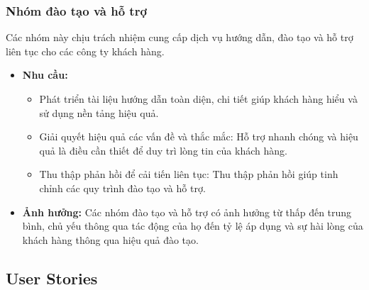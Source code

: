 \subsubsection{Nhóm đào tạo và hỗ trợ}

Các nhóm này chịu trách nhiệm cung cấp dịch vụ hướng dẫn, đào tạo và hỗ trợ liên tục cho các công ty khách hàng.

\begin{itemize}
    \item \textbf{Nhu cầu:}
    \begin{itemize}
        \item Phát triển tài liệu hướng dẫn toàn diện, chi tiết giúp khách hàng hiểu và sử dụng nền tảng hiệu quả.
        \item Giải quyết hiệu quả các vấn đề và thắc mắc: Hỗ trợ nhanh chóng và hiệu quả là điều cần thiết để duy trì lòng tin của khách hàng.
        \item Thu thập phản hồi để cải tiến liên tục: Thu thập phản hồi giúp tinh chỉnh các quy trình đào tạo và hỗ trợ.
    \end{itemize}
    \item \textbf{Ảnh hưởng:} Các nhóm đào tạo và hỗ trợ có ảnh hưởng từ thấp đến trung bình, chủ yếu thông qua tác động của họ đến tỷ lệ áp dụng và sự hài lòng của khách hàng thông qua hiệu quả đào tạo.
\end{itemize}

\subsection{User Stories}

